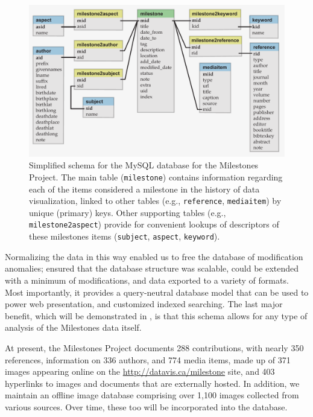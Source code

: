 \begin{figure}[!htb]
  \centering
  \includegraphics[width=\textwidth,clip]{fig/datavis-schema-3}
  \caption{Simplified schema for the MySQL database for the Milestones Project. The main table (\texttt{milestone}) contains information regarding each of the items considered a milestone in the history of data visualization, linked to other tables (e.g., \texttt{reference}, \texttt{mediaitem}) by unique (primary) keys. Other supporting tables (e.g., \texttt{milestone2aspect}) provide for convenient lookups of descriptors of these milestones items (\texttt{subject}, \texttt{aspect}, \texttt{keyword}).
  }
  \label{fig:datavis-schema-2}
\end{figure}

Normalizing the data in this way enabled us to free the database of modification anomalies; ensured that the database structure was scalable, could be extended with a minimum of modifications, and data exported to a variety of formats. Most importantly, it provides a query-neutral database model \citep{Codd:1971} that can be used to power web presentation, and customized indexed searching. The last major benefit, which will be demonstrated in , is that this schema allows for any type of analysis of the Milestones data itself.

At present, the Milestones Project documents 288 contributions, with nearly 350 references, information on 336 authors, and 774 media items, made up of 371 images appearing online on the \url{http://datavis.ca/milestone} site, and 403 hyperlinks to images and documents that are externally hosted. In addition, we maintain an offline image database comprising over 1,100 images collected from various sources. Over time, these too will be incorporated into the database.

